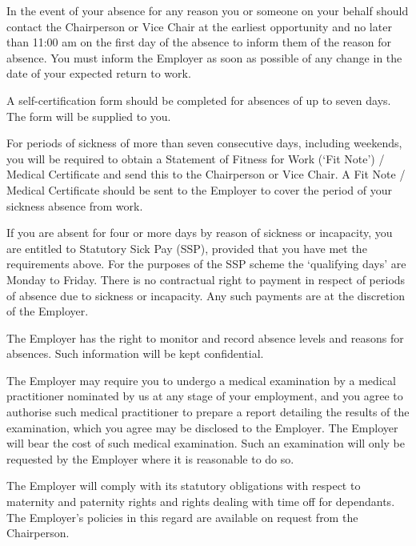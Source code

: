 \documentclass[a4paper,11pt,onecolumn ]{article}
\begin{document}
\begin{legal}
\begin{legal}
\item In the event of your absence for any reason you or someone on your behalf
should contact the Chairperson or Vice Chair at the earliest opportunity and no
later than 11:00 am on the first day of the absence to inform them of the reason
for absence. You must inform the Employer as soon as possible of any change in
the date of your expected return to work.
\item A self-certification form should be completed for absences of up to seven days.
The form will be supplied to you.
\item For periods of sickness of more than seven consecutive days, including
weekends, you will be required to obtain a Statement of Fitness for Work (‘Fit
Note’) / Medical Certificate and send this to the Chairperson or Vice Chair. A Fit
Note / Medical Certificate should be sent to the Employer to cover the period of
your sickness absence from work.
\item If you are absent for four or more days by reason of sickness or incapacity, you
are entitled to Statutory Sick Pay (SSP), provided that you have met the
requirements above. For the purposes of the SSP scheme the ‘qualifying days’
are Monday to Friday. There is no contractual right to payment in respect of
periods of absence due to sickness or incapacity. Any such payments are at the
discretion of the Employer.
\item The Employer has the right to monitor and record absence levels and reasons
for absences. Such information will be kept confidential.
\item The Employer may require you to undergo a medical examination by a medical
practitioner nominated by us at any stage of your employment, and you agree to
authorise such medical practitioner to prepare a report detailing the results of
the examination, which you agree may be disclosed to the Employer. The
Employer will bear the cost of such medical examination. Such an examination
will only be requested by the Employer where it is reasonable to do so.
\end{legal}

\item {}
The Employer will comply with its statutory obligations with respect to maternity
and paternity rights and rights dealing with time off for dependants. The Employer’s
policies in this regard are available on request from the Chairperson.


\end{legal}
\end{document}
